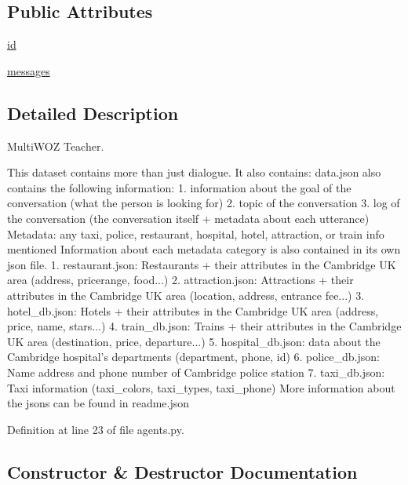 \subsection*{Public Attributes}
\begin{DoxyCompactItemize}
\item 
\hyperlink{classparlai_1_1tasks_1_1multiwoz_1_1agents_1_1MultiWozTeacher_a8e59cea446db2909435c9bac275e2539}{id}
\item 
\hyperlink{classparlai_1_1tasks_1_1multiwoz_1_1agents_1_1MultiWozTeacher_a40d3917ab5dadef1f822ac3c1d06c915}{messages}
\end{DoxyCompactItemize}


\subsection{Detailed Description}
\begin{DoxyVerb}MultiWOZ Teacher.

This dataset contains more than just dialogue. It also contains:
data.json also contains the following information:
1. information about the goal of the conversation (what the person is looking for)
2. topic of the conversation
3. log of the conversation (the conversation itself + metadata about each utterance)
      Metadata: any taxi, police, restaurant, hospital, hotel, attraction, or train info mentioned
Information about each metadata category is also contained in its own json file.
1. restaurant.json: Restaurants + their attributes in the Cambridge UK area (address, pricerange, food...)
2. attraction.json: Attractions + their attributes in the Cambridge UK area (location, address, entrance fee...)
3. hotel_db.json: Hotels + their attributes in the Cambridge UK area  (address, price, name, stars...)
4. train_db.json: Trains + their attributes in the Cambridge UK area (destination, price, departure...)
5. hospital_db.json: data about the Cambridge hospital's departments (department, phone, id)
6. police_db.json: Name address and phone number of Cambridge police station
7. taxi_db.json: Taxi information (taxi_colors, taxi_types, taxi_phone)
More information about the jsons can be found in readme.json
\end{DoxyVerb}
 

Definition at line 23 of file agents.\+py.



\subsection{Constructor \& Destructor Documentation}
\mbox{\label{classparlai_1_1tasks_1_1multiwoz_1_1agents_1_1MultiWozTeacher_aa4f519ba640d9ddb296af9120d188d7e}} 
